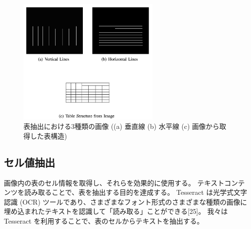 \documentclass[uplatex, twocolumn,10pt]{jsarticle}
\begin{document}
\begin{figure}[tp]
    \begin{center}
        \includegraphics*[width=7cm]{image/master/master2/Fig3.png}
        \caption{表抽出における3種類の画像 ((a) 垂直線 (b) 水平線 (c) 画像から取得した表構造)}
        \label{fig3}
    \end{center}
\end{figure}


\subsection{セル値抽出}
画像内の表のセル情報を取得し、それらを効果的に使用する。
テキストコンテンツを読み取ることで、表を抽出する目的を達成する。
Tesseract は光学式文字認識 (OCR) ツールであり、さまざまなフォント形式のさまざまな種類の画像に埋め込まれたテキストを認識して「読み取る」ことができる[25]。
我々は Tesseract を利用することで、表のセルからテキストを抽出する。
\end{document}
